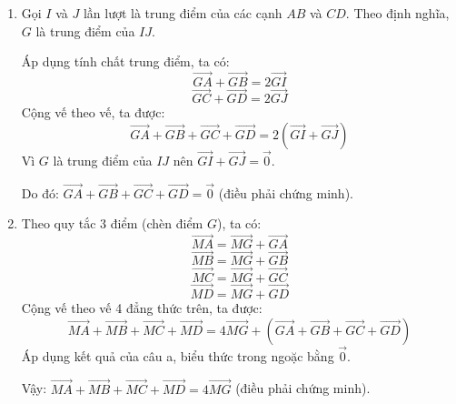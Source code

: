 \documentclass[12pt]{article}
\begin{document}
	\begin{loigiai}
		\begin{enumerate}[label=\alph*)]
			\item Gọi $I$ và $J$ lần lượt là trung điểm của các cạnh $AB$ và $CD$. Theo định nghĩa, $G$ là trung điểm của $IJ$.
			
			Áp dụng tính chất trung điểm, ta có:
			$$ \overrightarrow{GA} + \overrightarrow{GB} = 2\overrightarrow{GI} $$
			$$ \overrightarrow{GC} + \overrightarrow{GD} = 2\overrightarrow{GJ} $$
			Cộng vế theo vế, ta được:
			$$ \overrightarrow{GA} + \overrightarrow{GB} + \overrightarrow{GC} + \overrightarrow{GD} = 2(\overrightarrow{GI} + \overrightarrow{GJ}) $$
			Vì $G$ là trung điểm của $IJ$ nên $\overrightarrow{GI} + \overrightarrow{GJ} = \vec{0}$.
			
			Do đó: $\overrightarrow{GA} + \overrightarrow{GB} + \overrightarrow{GC} + \overrightarrow{GD} = \vec{0}$ (điều phải chứng minh).
			
			\item Theo quy tắc 3 điểm (chèn điểm $G$), ta có:
			$$ \overrightarrow{MA} = \overrightarrow{MG} + \overrightarrow{GA} $$
			$$ \overrightarrow{MB} = \overrightarrow{MG} + \overrightarrow{GB} $$
			$$ \overrightarrow{MC} = \overrightarrow{MG} + \overrightarrow{GC} $$
			$$ \overrightarrow{MD} = \overrightarrow{MG} + \overrightarrow{GD} $$
			Cộng vế theo vế 4 đẳng thức trên, ta được:
			$$ \overrightarrow{MA} + \overrightarrow{MB} + \overrightarrow{MC} + \overrightarrow{MD} = 4\overrightarrow{MG} + (\overrightarrow{GA} + \overrightarrow{GB} + \overrightarrow{GC} + \overrightarrow{GD}) $$
			Áp dụng kết quả của câu a, biểu thức trong ngoặc bằng $\vec{0}$.
			
			Vậy: $\overrightarrow{MA} + \overrightarrow{MB} + \overrightarrow{MC} + \overrightarrow{MD} = 4\overrightarrow{MG}$ (điều phải chứng minh).
		\end{enumerate}
	\end{loigiai}
	
\end{document}
